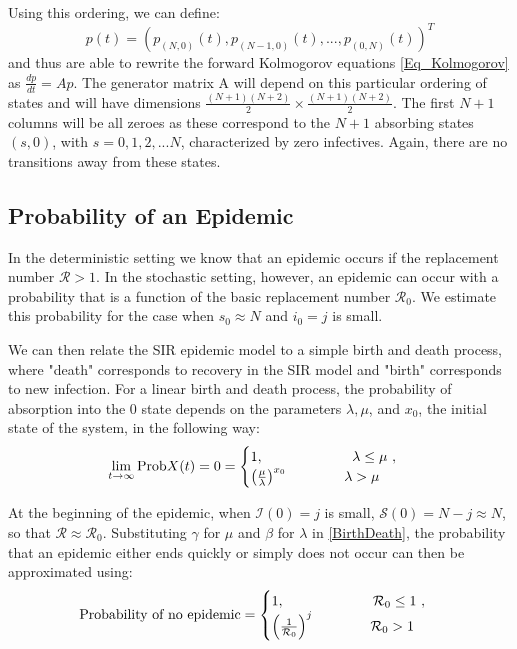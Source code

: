 \documentclass[reqno,11pt]{amsart}
\newcommand{\tab}{\hspace*{2em}}
\begin{document}
Using this ordering, we can define:
\begin{equation*}
p(t) = (p_{(N,0)}(t),p_{(N-1,0)}(t),...,p_{(0,N)}(t) )^T
\end{equation*}
and thus are able to rewrite the forward Kolmogorov equations \eqref{Eq_Kolmogorov} as $\frac{dp}{dt}=Ap$. The generator matrix A will depend on this particular ordering of states and will have dimensions $\frac{(N+1)(N+2)}{2} \times \frac{(N+1)(N+2)}{2}$. The first $ N+1 $ columns will be all zeroes as these correspond to the $N+1$ absorbing states $(s,0)$, with $s = 0, 1, 2, ...N$, characterized by zero infectives. Again, there are no transitions away from these states.
%
%
%
%	
\subsection{Probability of an Epidemic}
In the deterministic setting we know that an epidemic occurs if the replacement number $\mathcal R > 1$. In the stochastic setting, however, an epidemic can occur with a probability that is a function of the basic replacement number $\mathcal R_0$. We estimate this probability for the case when $s_0 \approx N$ and $i_0 = j$ is small. 


We can then relate the SIR epidemic model to a simple birth and death process, where "death" corresponds to recovery in the SIR model and "birth" corresponds to  new infection. For a linear birth and death process, the probability of absorption into the 0 state depends on the parameters $\lambda , \mu$, and $x_0$, the initial state of the system, in the following way:
\begin{equation}\label{BirthDeath}
\lim _{t\rightarrow \infty} \text{Prob}{X(t) = 0}  = \begin{cases}
1, \text{ \tab \tab \tab $\lambda \le \mu $ },\\
\left ( \frac{\mu}{\lambda} \right ) ^{x_0} \text{\tab \tab   $\lambda > \mu $}
\end{cases}
\end{equation}


At the beginning of the epidemic, when $\mathcal I(0) = j$ is small, $\mathcal S(0) = N - j \approx N$, so that $\mathcal R \approx \mathcal R_0$. Substituting $\gamma$ for $\mu$ and $\beta$ for $\lambda$ in \eqref{BirthDeath}, the probability that an epidemic either ends quickly or simply does not occur can then be approximated using:
\begin{equation}
\text{Probability of no epidemic} = \begin{cases}
1, \text{ \tab \tab \tab $\mathcal R_0 \le 1$ },\\
\left ( \frac{1}{\mathcal R_0} \right ) ^j \text{\tab \tab $\mathcal R_0 > 1$}
\end{cases}
\end{equation}
\end{document}
